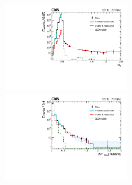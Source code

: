 \begin{figure}[!h]
  \begin{center}
    \includegraphics[width=0.49\textwidth]{figures/kine/v2/alphaT_2015_160824_v2} \,
    \includegraphics[width=0.49\textwidth]{figures/kine/v2/bDPhi_2015_160824_v2} \\
  \end{center}
  \caption{ 
}
\end{figure}
